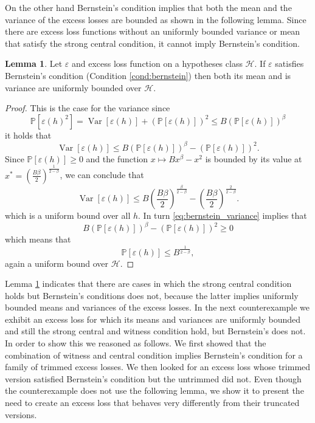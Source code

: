 \documentclass{uvamath}
\newcommand*{\calH}{\mathcal{H}}
\newcommand*{\bbP}{\mathbb{P}}
\newcommand*{\paren}[1]{\left(#1\right)}
\DeclareMathOperator{\var}{Var}
\theoremstyle{remark}
\theoremstyle{definition}
\theoremstyle{definition}
\theoremstyle{definition}
\theoremstyle{definition}
\newtheorem{lemma}[theorem]{Lemma}
\theoremstyle{definition}
\begin{document}
On the other hand Bernstein's condition implies that both the mean and
the variance of the excess losses are bounded as shown in the
following lemma. Since there are excess loss functions without an
uniformly bounded variance or mean that satisfy the strong central
condition, it cannot imply Bernstein's condition.

\begin{lemma}\label{lem:bernstein_bounded_var_mean}
  Let $\varepsilon$ and excess loss function on a hypotheses class
  $\calH$. If $\varepsilon$ satisfies Bernstein's condition (Condition
  \ref{cond:bernstein}) then both its mean and is variance are
  uniformly bounded over $\calH$.
\end{lemma}
\begin{proof}
  This is the case for the variance since
  \begin{equation*}
    \bbP[\varepsilon(h)^2] = \var[\varepsilon(h)]  + (\bbP[\varepsilon(h)])^2 \leq B(\bbP[\varepsilon(h)])^\beta
  \end{equation*}
  it holds that
  \begin{equation}\label{eq:bernstein_variance}
    \var [\varepsilon(h)] \leq B(\bbP[\varepsilon(h)])^\beta -  (\bbP[\varepsilon(h)])^2.
  \end{equation}
  Since $\bbP[\varepsilon(h)] \geq 0$ and the function
  $x\mapsto Bx^\beta - x^2$ is bounded by its value at
  $x^* = \paren{\frac{B\beta}{2}}^\frac{1}{2-\beta}$, we can conclude
  that
  \begin{equation*}
    \var[\varepsilon(h)] \leq B\paren{\frac{B\beta}{2}}^\frac{\beta}{2-\beta} - \paren{\frac{B\beta}{2}}^\frac{2}{2-\beta}.
  \end{equation*}
  which is a uniform bound over all $h$. In turn
  \eqref{eq:bernstein_variance} implies that
  \begin{equation*}
    B(\bbP[\varepsilon(h)])^\beta -  (\bbP[\varepsilon(h)])^2 \geq 0
  \end{equation*}
  which means that
  \begin{equation*}
    \bbP[\varepsilon(h)] \leq B^\frac{1}{2-\beta},
  \end{equation*}
  again a uniform bound over $\calH$.
\end{proof}

Lemma \ref{lem:bernstein_bounded_var_mean} indicates that there are
cases in which the strong central condition holds but Bernstein's
conditions does not, because the latter implies uniformly bounded
means and variances of the excess losses. In the next counterexample
we exhibit an excess loss for which its means and variances are
uniformly bounded and still the strong central and witness condition
hold, but Bernstein's does not. In order to show this we reasoned as
follows. We first showed that the combination of witness and central
condition implies Bernstein's condition for a family of trimmed excess
losses.  We then looked for an excess loss whose trimmed version
satisfied Bernstein's condition but the untrimmed did not. Even though
the counterexample does not use the following lemma, we show it to
present the need to create an excess loss that behaves very
differently from their truncated versions.
\end{document}
